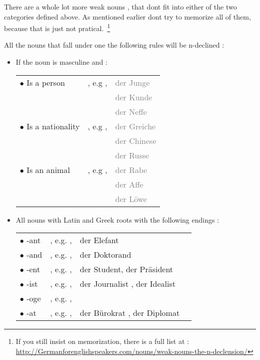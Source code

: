 \documentclass[a4paper,twocolumn,10pt]{article}
\newcommand{\newpar}
{\par \vspace{0.3cm}}
\newcommand{\bulletpoint}
{ $\bullet$  }
\begin{document}
There are a whole lot more weak nouns , that dont fit into either of the two
categories defined above. As mentioned earlier dont try to memorize all of them,
because that is just not pratical.~\footnote{ If you still insist on
	memorization, there is a full list at :  \url{http://Germanforenglishspeakers.com/nouns/weak-nouns-the-n-declension/} }



All the nouns that fall under one the following rules will be n-declined
:\newpar

\nolinenumbers
\begin{itemize}[noitemsep]
	\item If the noun is masculine and :

	\vspace{0.5cm}
	\begin{tabularx}{0.95\linewidth}{llX}

		\rowcolor{white} \bulletpoint Is a person & , e.g , & \textcolor{gray}{der Junge} \\
		\rowcolor{white} & & \textcolor{gray}{der Kunde} \\
		\rowcolor{white} & & \textcolor{gray}{der Neffe} \\
		\rowcolor{white} \bulletpoint Is a nationality & , e.g , & \textcolor{gray}{der Greiche} \\
		\rowcolor{white} & & \textcolor{gray}{der Chinese} \\
		\rowcolor{white} & & \textcolor{gray}{der Russe} \\
		\rowcolor{white} \bulletpoint Is an animal & , e.g , & \textcolor{gray}{der Rabe} \\
		\rowcolor{white} & & \textcolor{gray}{der Affe} \\
		\rowcolor{white} & & \textcolor{gray}{der Löwe} \\

	\end{tabularx}


	\item All nouns with Latin and Greek roots with the following endings :


\vspace{0.5cm}
\begin{tabularx}{0.95\linewidth}{lllX}

\rowcolor{white} \bulletpoint -ant & , e.g. , & der Elefant  \\
\rowcolor{white} \bulletpoint -and & , e.g. , & der Doktorand\\
\rowcolor{white} \bulletpoint -ent & , e.g. , & der Student, der Präsident\\
\rowcolor{white} \bulletpoint -ist & , e.g. , & der Journalist , der Idealist\\
\rowcolor{white} \bulletpoint -oge & , e.g. , & \\
\rowcolor{white} \bulletpoint -at & , e.g. , & der Bürokrat , der Diplomat\\
\end{tabularx}


\end{itemize}
\end{document}
